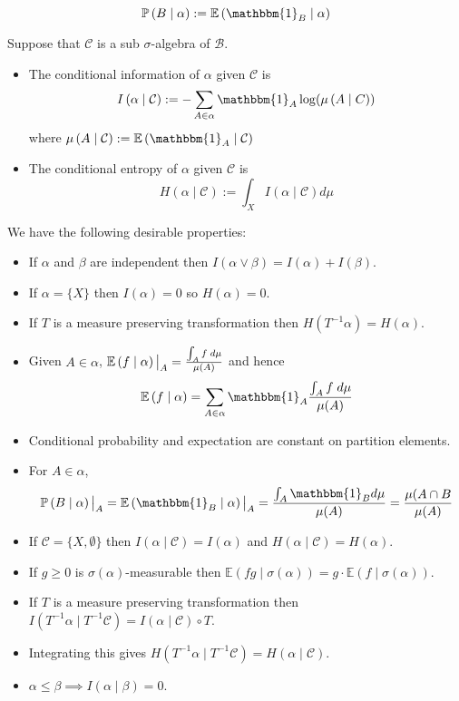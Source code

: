\documentclass[11pt]{article}
\newcommand{\defeq}{:=}
\newcommand{\indic}[1]{\mathbbm{1}_{#1}}
\newcommand\restr[2]{{%
  \left.\kern-\nulldelimiterspace %
  #1 %
  \vphantom{\big|} %
  \right|_{#2} %
  }}
\newcommand{\gvn}[2]{\ensuremath{\left(#1\;|\;#2\right)}}
\newcommand{\expg}[2]{\ensuremath{\mathbb{E}\gvn{#1}{#2}}}
\newcommand{\infog}[2]{\ensuremath{I\gvn{#1}{#2}}}
\newcommand{\entrg}[2]{\ensuremath{H\gvn{#1}{#2}}}
\newcommand{\probg}[2]{\ensuremath{\mathbb{P}\gvn{#1}{#2}}}
\newenvironment{defin}
	{\begin{mdframed}[backgroundcolor=white, roundcorner=5pt, linewidth=1pt]}
	{\end{mdframed}}
\newcommand{\mdf}[1]{{\color{red} #1}}
\begin{document}
\begin{defin}
\begin{itemize}
		$$\probg{B}{\alpha}\defeq\expg{\indic{B}}{\alpha}$$
\end{itemize}
Suppose that $\mathcal{C}$ is a sub $\sigma$-algebra of $\mathcal{B}$.
\begin{itemize}
	\item The \mdf{conditional information of $\alpha$ given $\mathcal{C}$} is
		$$\infog{\alpha}{\mathcal{C}}\defeq - \sum_{A\in\alpha}\indic{A}\log(\mu\gvn{A}{C})$$
	where $\mu\gvn{A}{\mathcal{C}}\defeq\expg{\indic{A}}{\mathcal{C}}$
	\item The \mdf{conditional entropy of $\alpha$ given $\mathcal{C}$} is
			$$\entrg{\alpha}{\mathcal{C}}\defeq\int_X\infog{\alpha}{\mathcal{C}}d\mu$$	
\end{itemize}
\end{defin}
We have the following desirable properties:
\begin{itemize}
	\item If $\alpha$ and $\beta$ are independent then $I(\alpha\vee\beta)=I(\alpha)+I(\beta)$.
	\item If $\alpha=\{X\}$ then $I(\alpha)=0$ so $H(\alpha)=0$.
	\item If $T$ is a measure preserving transformation then $H(T^{-1}\alpha)=H(\alpha)$.
	\item Given $A\in\alpha$, $\restr{\expg{f}{\alpha}}{A}=\frac{\int_A f \;d\mu}{\mu(A)}$ and hence
		$$\expg{f}{\alpha}=\sum_{A\in\alpha}\indic{A}\frac{\int_A f \;d\mu}{\mu(A)}$$
	\item Conditional probability and expectation are constant on partition elements.
	\item For $A\in\alpha$, 
		$$\restr{\probg{B}{\alpha}}{A}=\restr{\expg{\indic{B}}{\alpha}}{A}=\frac{\int_A \indic{B} d\mu}{\mu(A)}=\frac{\mu(A\cap B}{\mu(A)}$$
	\item If $\mathcal{C}=\{X,\emptyset\}$ then $\infog{\alpha}{\mathcal{C}}=I(\alpha)$ and $\entrg{\alpha}{\mathcal{C}}=H(\alpha)$.
	\item If $g\geq 0$ is $\sigma(\alpha)$-measurable then $\expg{fg}{\sigma(\alpha)}=g\cdot\expg{f}{\sigma(\alpha)}$.
	\item If $T$ is a measure preserving transformation then $\infog{T^{-1}\alpha}{T^{-1}\mathcal{C}}=\infog{\alpha}{\mathcal{C}}\circ T$.
	\item Integrating this gives $\entrg{T^{-1}\alpha}{T^{-1}\mathcal{C}}=\entrg{\alpha}{\mathcal{C}}$.
	\item $\alpha\leq\beta\implies\infog{\alpha}{\beta}=0$.
\end{itemize}
\end{document}

